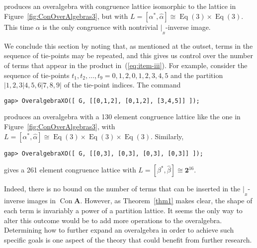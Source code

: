 \documentclass{au}
\numberwithin{equation}{section}
\theoremstyle{plain}
\theoremstyle{definition}
\newcommand{\<}{\ensuremath{\langle}}
\renewcommand{\>}{\ensuremath{\rangle}}
\newcommand{\bA}{\ensuremath{\mathbf{A}}}
\DeclareMathOperator{\Eq}{Eq}
\DeclareMathOperator{\Con}{Con}
\newcommand{\resB}{\ensuremath{|_{_B}}}
\newcommand{\two}{\ensuremath{\mathbf{2}}}
\begin{document}
\noindent %
produces an overalgebra with congruence lattice isomorphic to the lattice in
Figure~\ref{fig:ConOverAlgebras3}, but with
$L =[\alpha^*, \widehat{\alpha}]\cong \Eq(3) \times\Eq(3)$.  This time $\alpha$ is the only congruence
with nontrivial $\resB$-inverse image.

We conclude this section by noting that, as mentioned at the outset, terms in
the sequence of tie-points may be repeated, and this gives us control over the
number of terms that appear in the product in~(\ref{eq:item-iii}).  For example,
consider the sequence of tie-points $t_1, t_2, \dots, t_9 = 0,1,2,0,1,2,3,4,5$ and
the partition $|1,2,3|4,5,6|7,8,9|$ of the tie-point indices.  The command

\begin{small}
\begin{verbatim}
gap> OveralgebraXO([ G, [[0,1,2], [0,1,2], [3,4,5]] ]);
\end{verbatim}
\end{small}

\noindent %
produces an overalgebra with a 130 element congruence lattice
like the one in Figure~\ref{fig:ConOverAlgebras3}, with
$L =[\alpha^*, \widehat{\alpha}]\cong \Eq(3)\times \Eq(3)\times \Eq(3)$.  Similarly,

\begin{small}
\begin{verbatim}
gap> OveralgebraXO([ G, [[0,3], [0,3], [0,3], [0,3]] ]);
\end{verbatim}
\end{small}

\noindent %
 gives a 261 element congruence lattice
with $ L=[\beta^*, \widehat{\beta}] \cong \two^{16}$. %

Indeed, there is no bound on the number of terms that can be inserted in the
$\resB$-inverse images in $\Con \bA$.  However, as Theorem~\ref{thm1}
makes clear, the shape of each term is invariably a power of a partition
lattice.  It seems the only way to alter this outcome would be
to add more operations to the overalgebra.  Determining how to further expand
an overalgebra in order to achieve such specific goals is one aspect of the
theory that could benefit from further research.



\end{document}
